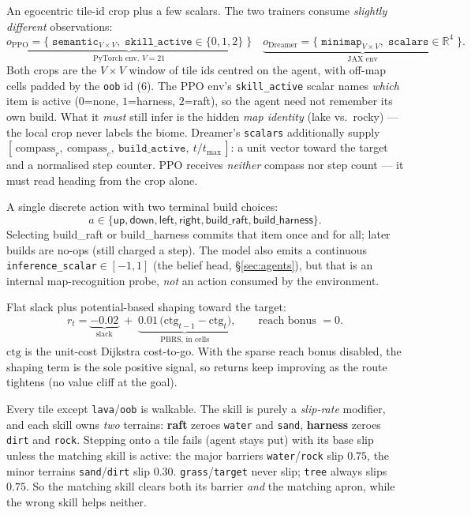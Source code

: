 \documentclass[11pt]{article}
\begin{document}
\begin{description}[leftmargin=1.4em, itemsep=2pt]
\item[Observation] An egocentric tile-id crop plus a few scalars. The two
  trainers consume \emph{slightly different} observations:
  \[
    \underbrace{o_{\text{PPO}} = \{\;\texttt{semantic}_{V\times V},\;
            \texttt{skill\_active}\in\{0,1,2\}\;\}}_{\text{PyTorch env},\ V=21}
    \quad
    \underbrace{o_{\text{Dreamer}} = \{\;\texttt{minimap}_{V\times V},\;
            \texttt{scalars}\in\mathbb{R}^4\;\}}_{\text{JAX env}}.
  \]
  Both crops are the $V{\times}V$ window of tile ids centred on the agent, with
  off-map cells padded by the \texttt{oob} id ($6$). The PPO env's
  \texttt{skill\_active} scalar names \emph{which} item is active
  ($0$=none, $1$=harness, $2$=raft), so the agent need not remember its own
  build. What it \emph{must} still infer is the hidden \emph{map identity}
  (lake vs.\ rocky) --- the local crop never labels the biome.
  Dreamer's \texttt{scalars} additionally supply
  $[\,\text{compass}_r,\ \text{compass}_c,\ \texttt{build\_active},\ t/t_{\max}\,]$:
  a unit vector toward the target and a normalised step counter. PPO receives
  \emph{neither} compass nor step count --- it must read heading from the crop
  alone.
\item[Action] A single discrete action with two terminal build choices:
  \[
    a\in\{\textsf{up},\textsf{down},\textsf{left},\textsf{right},
          \textsf{build\_raft},\textsf{build\_harness}\}.
  \]
  Selecting \textsf{build\_raft} or \textsf{build\_harness} commits that item
  once and for all; later builds are no-ops (still charged a step). The model
  also emits a continuous \texttt{inference\_scalar}$\in[-1,1]$ (the belief
  head, \S\ref{sec:agents}), but that is an internal map-recognition probe,
  \emph{not} an action consumed by the environment.
\item[Reward] Flat slack plus potential-based shaping toward the target:
  \[
    r_t = \underbrace{-0.02}_{\text{slack}}
        \;+\; \underbrace{0.01\,\bigl(\mathrm{ctg}_{t-1}-\mathrm{ctg}_{t}\bigr)}_{\text{PBRS, in cells}},
        \qquad \text{reach bonus } = 0 .
  \]
  $\mathrm{ctg}$ is the unit-cost Dijkstra cost-to-go. With the sparse
  reach bonus disabled, the shaping term is the sole positive signal, so
  returns keep improving as the route tightens (no value cliff at the goal).
\item[Slip] Every tile except \texttt{lava}/\texttt{oob} is walkable. The skill
  is purely a \emph{slip-rate} modifier, and each skill owns \emph{two}
  terrains: \textbf{raft} zeroes \texttt{water} and \texttt{sand}, \textbf{harness}
  zeroes \texttt{dirt} and \texttt{rock}. Stepping onto a tile fails (agent stays
  put) with its base slip unless the matching skill is active: the major
  barriers \texttt{water}/\texttt{rock} slip $0.75$, the minor terrains
  \texttt{sand}/\texttt{dirt} slip $0.30$. \texttt{grass}/\texttt{target} never
  slip; \texttt{tree} always slips $0.75$. So the matching skill clears both its
  barrier \emph{and} the matching apron, while the wrong skill helps neither.
\end{description}
\end{document}
